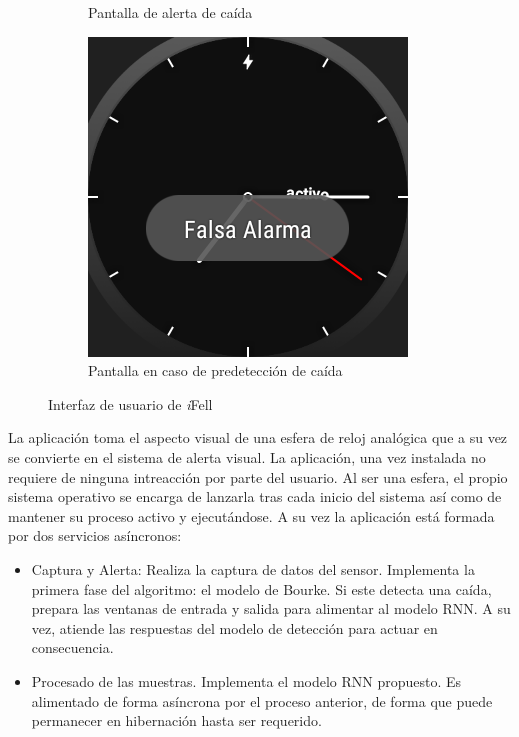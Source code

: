 \documentclass[11pt,a4paper,spanish,twocolumn]{article}
\def\ifell/{\textsl{\textsf{i}}\textsf{Fell}}
\begin{document}
\begin{figure}[!ht]
\begin{subfigure}[b]{0.48\columnwidth}
      \caption{\footnotesize Pantalla de alerta de caída}
      \label{fig:uiAlerta}
  \end{subfigure}
  \hfill
  \begin{subfigure}[b]{0.48\columnwidth}
      \centering
      \includegraphics[width=\linewidth]{img/appAlertaFalsa.png}
      \caption{\footnotesize Pantalla en caso de predetección de caída}
      \label{fig:uiAlertaFalsa}
  \end{subfigure}
  \caption{\footnotesize \label{fig:ifell:UI} Interfaz de usuario de \ifell/}
\end{figure}

La aplicación toma el aspecto visual de una esfera de reloj analógica que a su vez se convierte en el sistema de alerta visual. La aplicación, una vez instalada no requiere de ninguna intreacción por parte del usuario. Al ser una esfera, el propio sistema operativo se encarga de lanzarla tras cada inicio del sistema así como de mantener su proceso activo y ejecutándose. A su vez la aplicación está formada por dos servicios asíncronos:
\begin{itemize}
  \item Captura y Alerta: Realiza la captura de datos del sensor. Implementa la primera fase del algoritmo: el modelo de Bourke.  Si este detecta una caída, prepara las ventanas de entrada y salida para alimentar al modelo RNN. A su vez, atiende las respuestas del modelo de detección para actuar en consecuencia.
  \item Procesado de las muestras. Implementa el modelo RNN propuesto. Es alimentado de forma asíncrona por el proceso anterior, de forma que puede permanecer en hibernación hasta ser requerido.
\end{itemize}
\end{document}
